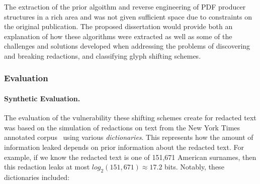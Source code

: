 The extraction of the prior algoithm and reverse engineering of PDF producer structures in a rich area and was not given sufficient space due to constraints on the original publication.
The proposed dissertation would provide both an explanation of how these algorithms were extracted as well as some of the challenges and solutions developed when addressing the problems of discovering and breaking redactions, and classifying glyph shifting schemes.

\subsubsection{Evaluation}

\paragraph{Synthetic Evaluation.}
The evaluation of the vulnerability these shifting schemes create for redacted text was based on the simulation of redactions on text from the New York Times annotated corpus~\cite{nytCorp} using various \emph{dictionaries}.
This represents how the amount of information leaked depends on prior information about the redacted text. 
For example, if we know the redacted text is one of 151,671 American surnames, then this redaction leaks at most $log_{2}(151, 671) \approx 17.2$ bits. 
Notably, these dictionaries included:



